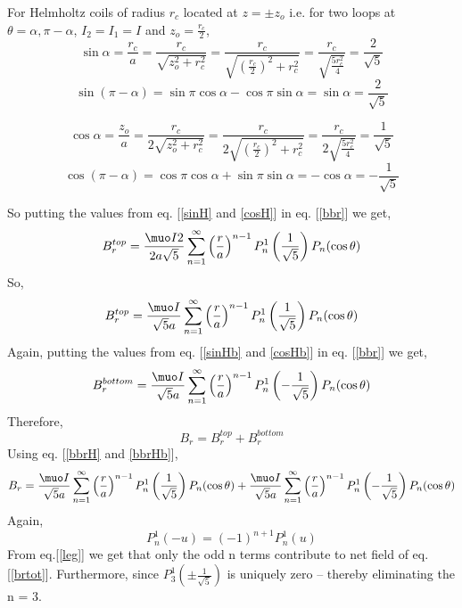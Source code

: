 For Helmholtz coils of radius \(r_c\) located at \(z=\pm z_o\) i.e. for two loops at \(\theta=\alpha, \pi-\alpha \), \(I_2=I_1=I\) and \(z_o=\frac{r_c}{2}\),
\begin{equation}\label{sinH}
\sin\alpha=\frac{r_c}{a}=\frac{r_c}{\sqrt{z_o^2+r_c^2}}=\frac{r_c}{\sqrt{\left(\frac{r_c}{2}\right)^2+r_c^2}}=\frac{r_c}{\sqrt{\frac{5r_c^2}{4}}}=\frac{2}{\sqrt{5}}
\end{equation}
\begin{equation}\label{sinHb}
\sin(\pi-\alpha)=\sin\pi\cos\alpha-\cos\pi\sin\alpha=\sin\alpha=\frac{2}{\sqrt{5}}
\end{equation}

\begin{equation}\label{cosH}
\cos\alpha=\frac{z_o}{a}=\frac{r_c}{2\sqrt{z_o^2+r_c^2}}=\frac{r_c}{2\sqrt{\left(\frac{r_c}{2}\right)^2+r_c^2}}=\frac{r_c}{2\sqrt{\frac{5r_c^2}{4}}}=\frac{1}{\sqrt{5}}
\end{equation}
\begin{equation}\label{cosHb}
\cos(\pi-\alpha)=\cos\pi\cos\alpha+\sin\pi\sin\alpha=-\cos\alpha=-\frac{1}{\sqrt{5}}
\end{equation}


So putting the values from eq. [\ref{sinH} and \ref{cosH}] in eq. [\ref{bbr}] we get,
$$B_r^{top}=\frac{\muo I 2}{2a\sqrt{5}}\sum_{n=1}^{\infty} \left(\frac{r}{a}\right)^{n-1}P_n^1\left(\frac{1}{\sqrt{5}}\right) P_n(\cos\theta)$$
So,
\begin{equation}\label{bbrH}
B_r^{top}=\frac{\muo I }{\sqrt{5}a}\sum_{n=1}^{\infty} \left(\frac{r}{a}\right)^{n-1}P_n^1\left(\frac{1}{\sqrt{5}}\right) P_n(\cos\theta)
\end{equation}
Again, putting the values from eq. [\ref{sinHb} and \ref{cosHb}] in eq. [\ref{bbr}] we get,
\begin{equation}\label{bbrHb}
B_r^{bottom}=\frac{\muo I }{\sqrt{5}a}\sum_{n=1}^{\infty} \left(\frac{r}{a}\right)^{n-1}P_n^1\left(-\frac{1}{\sqrt{5}}\right) P_n(\cos\theta)
\end{equation}
Therefore,
\begin{equation}\label{brtot}
B_r=B_r^{top}+B_r^{bottom}
\end{equation}
Using eq. [\ref{bbrH} and \ref{bbrHb}],
$$B_r=\frac{\muo I }{\sqrt{5}a}\sum_{n=1}^{\infty} \left(\frac{r}{a}\right)^{n-1}P_n^1\left(\frac{1}{\sqrt{5}}\right) P_n(\cos\theta)+\frac{\muo I }{\sqrt{5}a}\sum_{n=1}^{\infty} \left(\frac{r}{a}\right)^{n-1}P_n^1\left(-\frac{1}{\sqrt{5}}\right) P_n(\cos\theta)$$
Again,
\begin{equation}\label{leg}
P_n^1(-u)=(-1)^{n+1}P_n^1(u)
\end{equation}
From eq.[\ref{leg}] we get that only the odd n terms contribute to net field of eq.[\ref{brtot}]. Furthermore, since \(P_3^1\left(\pm\frac{1}{\sqrt{5}}\right)\) is uniquely zero – thereby eliminating the n = 3.


